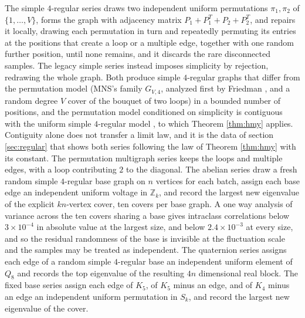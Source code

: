 \documentclass[12pt,oneside,english]{amsart}
\numberwithin{equation}{section}
\numberwithin{figure}{section}
\numberwithin{table}{section}
\theoremstyle{plain}
\numberwithin{thm}{section}
\theoremstyle{plain}
\theoremstyle{plain}
\theoremstyle{plain}
\theoremstyle{definition}
\theoremstyle{definition}
\theoremstyle{definition}
\theoremstyle{remark}
\begin{document}
The simple $4$-regular series draws two independent uniform permutations
$\pi_{1},\pi_{2}$ of $\{1,\dots,V\}$, forms the graph with adjacency
matrix $P_{1}+P_{1}^{T}+P_{2}+P_{2}^{T}$, and repairs it locally,
drawing each permutation in turn and repeatedly permuting its entries
at the positions that create a loop or a multiple edge, together with
one random further position, until none remains, and it discards the
rare disconnected samples. The legacy simple series instead imposes
simplicity by rejection, redrawing the whole graph. Both produce simple
$4$-regular graphs that differ from the permutation model (MNS's family
$G_{V,4}$, analyzed first by Friedman \cite{Friedman1991}, and a
random degree $V$ cover of the bouquet of two loops) in a bounded
number of positions, and the permutation model conditioned on simplicity
is contiguous with the uniform simple $4$-regular model \cite{GreenhillJansonKimWormald2002,Wormald1999},
to which Theorem \ref{thm:hmy} applies. Contiguity alone does not
transfer a limit law, and it is the data of section \ref{sec:regular}
that shows both series following the law of Theorem \ref{thm:hmy}
with its constant. The permutation multigraph series keeps the loops
and multiple edges, with a loop contributing $2$ to the diagonal.
The abelian series draw a fresh random simple $4$-regular base graph
on $n$ vertices for each batch, assign each base edge an independent
uniform voltage in $\mathbb{Z}_{k}$, and record the largest new eigenvalue
of the explicit $kn$-vertex cover, ten covers per base graph. A one
way analysis of variance across the ten covers sharing a base gives
intraclass correlations below $3\times10^{-4}$ in absolute value
at the largest size, and below $2.4\times10^{-3}$ at every size,
and so the residual randomness of the base is invisible at the fluctuation
scale and the samples may be treated as independent. The quaternion
series assigns each edge of a random simple $4$-regular base an independent
uniform element of $Q_{8}$ and records the top eigenvalue of the
resulting $4n$ dimensional real block. The fixed base series assign
each edge of $K_{5}$, of $K_{5}$ minus an edge, and of $K_{4}$
minus an edge an independent uniform permutation in $S_{k}$, and
record the largest new eigenvalue of the cover.
\end{document}
